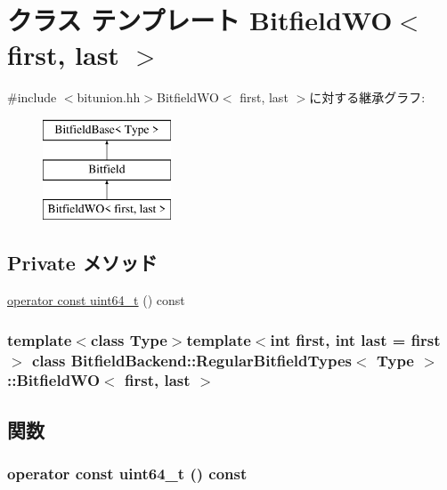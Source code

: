 \hypertarget{classBitfieldBackend_1_1RegularBitfieldTypes_1_1BitfieldWO}{
\section{クラス テンプレート BitfieldWO$<$ first, last $>$}
\label{classBitfieldBackend_1_1RegularBitfieldTypes_1_1BitfieldWO}
}


{\ttfamily \#include $<$bitunion.hh$>$}BitfieldWO$<$ first, last $>$に対する継承グラフ:\begin{figure}[H]
\begin{center}
\leavevmode
\includegraphics[height=3cm]{classBitfieldBackend_1_1RegularBitfieldTypes_1_1BitfieldWO}
\end{center}
\end{figure}
\subsection*{Private メソッド}
\begin{DoxyCompactItemize}
\item 
\hyperlink{classBitfieldBackend_1_1RegularBitfieldTypes_1_1BitfieldWO_a86f0216f6eb57ddf27a4f375c1d56d62}{operator const uint64\_\-t} () const 
\end{DoxyCompactItemize}
\subsubsection*{template$<$class Type$>$template$<$int first, int last = first$>$ class BitfieldBackend::RegularBitfieldTypes$<$ Type $>$::BitfieldWO$<$ first, last $>$}



\subsection{関数}
\hypertarget{classBitfieldBackend_1_1RegularBitfieldTypes_1_1BitfieldWO_a86f0216f6eb57ddf27a4f375c1d56d62}{
\subsubsection[{operator const uint64\_\-t}]{\setlength{\rightskip}{0pt plus 5cm}operator const uint64\_\-t () const}}
\label{classBitfieldBackend_1_1RegularBitfieldTypes_1_1BitfieldWO_a86f0216f6eb57ddf27a4f375c1d56d62}


